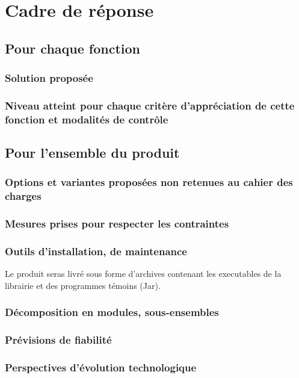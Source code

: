 \section{Cadre de réponse}

\subsection{Pour chaque fonction}

\subsubsection{Solution proposée}
\subsubsection{Niveau atteint pour chaque critère d’appréciation de cette fonction et modalités de contrôle}


\subsection{Pour l’ensemble du produit}

\subsubsection{Options et variantes proposées non retenues au cahier des charges}
\subsubsection{Mesures prises pour respecter les contraintes}

\subsubsection{Outils d’installation, de maintenance}

Le produit seras livré sous forme d'archives contenant les executables de la librairie et des programmes témoins (Jar).


\subsubsection{Décomposition en modules, sous-ensembles}
\subsubsection{Prévisions de fiabilité}
\subsubsection{Perspectives d’évolution technologique}
